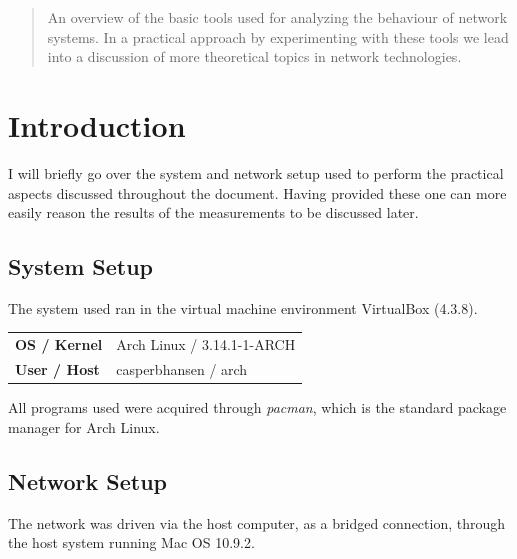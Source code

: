 \documentclass{acm_proc_article-sp}
\begin{document}
\maketitle
\begin{abstract}
    An overview of the basic tools used for analyzing the behaviour of network
    systems. In a practical approach by experimenting with these tools we lead
    into a discussion of more theoretical topics in network technologies.
\end{abstract}



\section{Introduction}
\label{sec:introduction}
I will briefly go over the system and network setup used to perform the
practical aspects discussed throughout the document. Having provided these one
can more easily reason the results of the measurements to be discussed later.

\subsection{System Setup}
\label{sec:introduction|sub:system-setup}
The system used ran in the virtual machine environment VirtualBox (4.3.8).

\begin{tabular}{ll}
    {\bf OS / Kernel}   & Arch Linux / 3.14.1-1-ARCH \\
    {\bf User / Host}   & casperbhansen / arch \\
\end{tabular}

All programs used were acquired through {\it pacman}, which is the
standard package manager for Arch Linux.

\subsection{Network Setup}
\label{sec:introduction|sub:network-setup}
The network was driven via the host computer, as a bridged connection,
through the host system running Mac OS 10.9.2.
\end{document}
